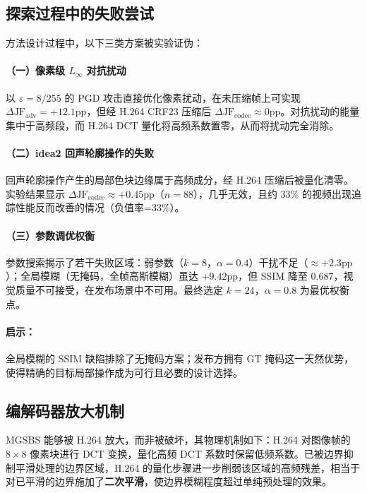 \documentclass[UTF8,a4paper,12pt]{ctexart}
\begin{document}
\subsection{探索过程中的失败尝试}

方法设计过程中，以下三类方案被实验证伪：

\paragraph{（一）像素级 $L_\infty$ 对抗扰动}
以 $\varepsilon=8/255$ 的 PGD 攻击直接优化像素扰动，在未压缩帧上可实现 $\Delta\text{JF}_{\text{adv}} = +12.1\text{pp}$，但经 H.264 CRF23 压缩后 $\Delta\text{JF}_{\text{codec}} \approx 0\text{pp}$。对抗扰动的能量集中于高频段，而 H.264 DCT 量化将高频系数置零，从而将扰动完全消除。

\paragraph{（二）idea2 回声轮廓操作的失败}
回声轮廓操作产生的局部色块边缘属于高频成分，经 H.264 压缩后被量化清零。实验结果显示 $\Delta\text{JF}_{\text{codec}} \approx +0.45\text{pp}$（$n=88$），几乎无效，且约 33\% 的视频出现追踪性能反而改善的情况（负值率=33\%）。

\paragraph{（三）参数调优权衡}
参数搜索揭示了若干失败区域：弱参数（$k=8$，$\alpha=0.4$）干扰不足（$\approx +2.3\text{pp}$）；全局模糊（无掩码，全帧高斯模糊）虽达 $+9.42\text{pp}$，但 SSIM 降至 0.687，视觉质量不可接受，在发布场景中不可用。最终选定 $k=24$，$\alpha=0.8$ 为最优权衡点。

\paragraph{启示：}全局模糊的 SSIM 缺陷排除了无掩码方案；发布方拥有 GT 掩码这一天然优势，使得精确的目标局部操作成为可行且必要的设计选择。

\subsection{编解码器放大机制}

MGSBS 能够被 H.264 放大，而非被破坏，其物理机制如下：H.264 对图像帧的 $8 \times 8$ 像素块进行 DCT 变换，量化高频 DCT 系数时保留低频系数。已被边界抑制平滑处理的边界区域，H.264 的量化步骤进一步削弱该区域的高频残差，相当于对已平滑的边界施加了\textbf{二次平滑}，使边界模糊程度超过单纯预处理的效果。
\end{document}

